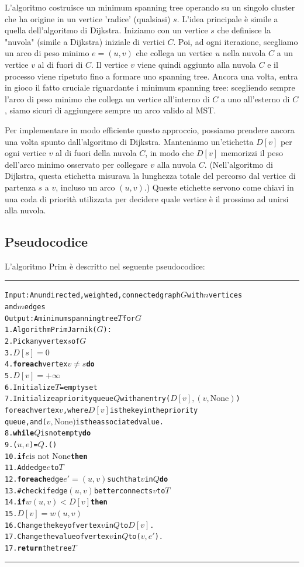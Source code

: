 L'algoritmo costruisce un minimum spanning tree operando su un singolo cluster che ha origine in un vertice 'radice' (qualsiasi) $s$. L'idea principale è simile a quella dell'algoritmo di Dijkstra. Iniziamo con un vertice $s$ che definisce la "nuvola" (simile a Dijkstra) iniziale di vertici $C$. Poi, ad ogni iterazione, scegliamo un arco di peso minimo $e = (u,v)$ che collega un vertice $u$ nella nuvola $C$ a un vertice $v$ al di fuori di $C$. Il vertice $v$ viene quindi aggiunto alla nuvola $C$ e il processo viene ripetuto fino a formare uno spanning tree. Ancora una volta, entra in gioco il fatto cruciale riguardante i minimum spanning tree: scegliendo sempre l'arco di peso minimo che collega un vertice all'interno di $C$ a uno all'esterno di $C$, siamo sicuri di aggiungere sempre un arco valido al MST.

Per implementare in modo efficiente questo approccio, possiamo prendere ancora una volta spunto dall'algoritmo di Dijkstra. Manteniamo un'etichetta $D[v]$ per ogni vertice $v$ al di fuori della nuvola $C$, in modo che $D[v]$ memorizzi il peso dell'arco minimo osservato per collegare $v$ alla nuvola $C$. (Nell'algoritmo di Dijkstra, questa etichetta misurava la lunghezza totale del percorso dal vertice di partenza $s$ a $v$, incluso un arco $(u,v)$.) Queste etichette servono come chiavi in una coda di priorità utilizzata per decidere quale vertice è il prossimo ad unirsi alla nuvola.

\clearpage
\subsection*{Pseudocodice}
L'algoritmo Prim è descritto nel seguente pseudocodice:
\vspace{1\baselineskip}
\hrule
\begin{alltt}
Input: An undirected, weighted, connected graph \(G\) with \(n\) vertices 
        and \(m\) edges
Output: A minimum spanning tree \(T\) for \(G\)
1.  Algorithm PrimJarnik(\(G\)):
2.      Pick any vertex \(s\) of \(G\)
3.      \(D[s] = 0\)
4.      \textbf{for each} vertex \(v \neq s\) \textbf{do}
5.          \(D[v] = +\infty\)
6.      Initialize \(T\) = empty set
7.      Initialize a priority queue \(Q\) with an entry (\(D[v], (v, \text{None})\))  
             for each vertex \(v\), where \(D[v]\) is the key in the priority  
             queue, and (\(v, \text{None})\) is the associated value.
8.      \textbf{while} \(Q\) is not empty \textbf{do}
9.          (\(u, e\)) =  \(Q\).()
10.         \textbf{if} \(e \text{is not None}\) \textbf{then}
11.             Add edge \(e\) to \(T\)
12.         \textbf{for each} edge \(e' = (u, v)\) such that \(v\) in \(Q\) \textbf{do}
13.             # check if edge \((u, v)\) better connects \(v\) to \(T\)
14.             \textbf{if} \(w(u, v) < D[v]\) \textbf{then}
15.                 \(D[v] = w(u, v)\)
16.                 Change the key of vertex \(v\) in \(Q\) to \(D[v]\).
17.                 Change the value of vertex \(v\) in \(Q\) to (\(v, e'\)).
17.     \textbf{return} the tree \(T\)     
\end{alltt}
\hrule 
\vspace{1\baselineskip}

